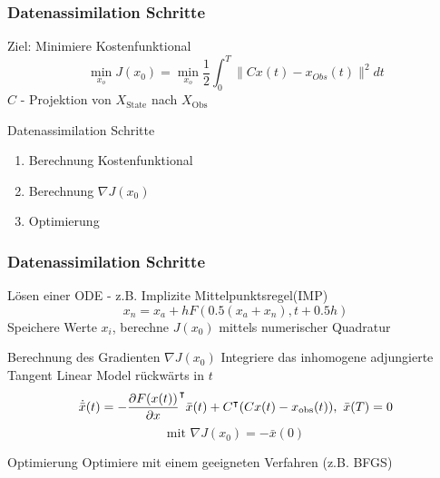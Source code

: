 \begin{frame}[<+->]
  \frametitle{Datenassimilation Schritte}
	\begin{block}{Ziel: Minimiere Kostenfunktional}
	\begin{equation}\label{eq:costFunctional}
		\min_{x_o} J(x_0) = \min_{x_o} \frac{1}{2}\int_0^T \|Cx(t) - x_{Obs}(t)\|^2dt
	\end{equation}
	  $C$ - Projektion von $X_{\text{State}}$ nach $X_{\text{Obs}}$ 
	\end{block}
	\begin{block}{Datenassimilation Schritte}
	\begin{enumerate}
	 \item Berechnung Kostenfunktional
	 \item Berechnung $\nabla J(x_0)$
	 \item Optimierung
	\end{enumerate}
	\end{block}
\end{frame}
 
\begin{frame}[<+->]
  \frametitle{Datenassimilation Schritte}
  \begin{block}{Lösen einer ODE - z.B. Implizite Mittelpunktsregel(IMP)}
	\begin{equation}
	 x_n = x_a + h F \left(0.5 (x_a + x_n), t + 0.5 h\right)
	\end{equation}
	Speichere Werte $x_i$, berechne $J(x_0)$ mittels numerischer Quadratur
  \end{block}
  \begin{block}{Berechnung des Gradienten $\nabla J(x_0)$}
	Integriere das inhomogene adjungierte Tangent Linear Model rückwärts in $t$
	\begin{equation}
	  \dot{ \bar{x}}(t) =  -\frac{\partial F(x(t))}{\partial x}^\intercal \bar x(t) +C^\intercal(Cx(t) - x_{\text{obs}}(t)), ~ \bar x(T) =0
	\end{equation}
	\[
	\text{mit }\nabla J(x_0) = -\bar x(0)
	\]
  \end{block}
  \begin{block}{Optimierung}
	Optimiere mit einem geeigneten Verfahren (z.B. BFGS)
  \end{block}

\end{frame} 

